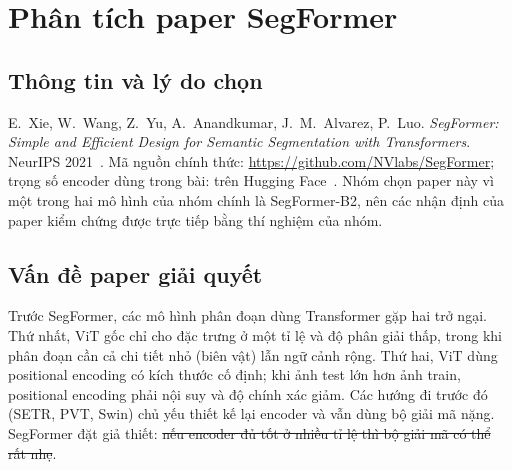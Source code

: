\section{Phân tích paper SegFormer}\label{sec:paper}

\subsection{Thông tin và lý do chọn}
E.~Xie, W.~Wang, Z.~Yu, A.~Anandkumar, J.~M.~Alvarez, P.~Luo. \emph{SegFormer: Simple and Efficient Design for Semantic
Segmentation with Transformers}. NeurIPS 2021~\cite{xie2021}. Mã nguồn chính thức: \url{https://github.com/NVlabs/SegFormer};
trọng số encoder dùng trong bài:  trên Hugging Face~\cite{wolf2020}. Nhóm chọn paper này vì một trong hai
mô hình của nhóm chính là SegFormer-B2, nên các nhận định của paper kiểm chứng được trực tiếp bằng thí nghiệm của nhóm.

\subsection{Vấn đề paper giải quyết}
Trước SegFormer, các mô hình phân đoạn dùng Transformer gặp hai trở ngại. Thứ nhất, ViT gốc chỉ cho đặc trưng ở một tỉ lệ
và độ phân giải thấp, trong khi phân đoạn cần cả chi tiết nhỏ (biên vật) lẫn ngữ cảnh rộng. Thứ hai, ViT dùng
positional encoding có kích thước cố định; khi ảnh test lớn hơn ảnh train, positional encoding phải nội suy và độ chính
xác giảm. Các hướng đi trước đó (SETR, PVT, Swin) chủ yếu thiết kế lại encoder và vẫn dùng bộ giải mã nặng. SegFormer
đặt giả thiết: \st{nếu encoder đủ tốt ở nhiều tỉ lệ thì bộ giải mã có thể rất nhẹ}.


